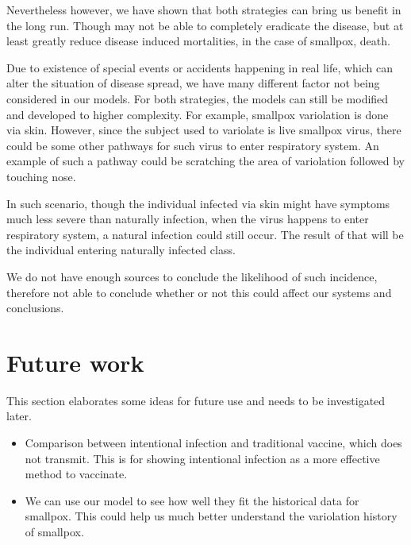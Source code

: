 \documentclass[12pt]{article}
\begin{document}
Nevertheless however, we have shown that both strategies can bring us benefit in the long run. Though may not be able to completely eradicate the disease, but at least greatly reduce disease induced mortalities, in the case of smallpox, death.

Due to existence of special events or accidents happening in real life, which can alter the situation of disease spread, we have many different factor not being considered in our models. For both strategies, the models can still be modified and developed to higher complexity. For example, smallpox variolation is done via skin. However, since the subject used to variolate is live smallpox virus, there could be some other pathways for such virus to enter respiratory system. An example of such a pathway could be scratching the area of variolation followed by touching nose.

In such scenario, though the individual infected via skin might have symptoms much less severe than naturally infection, when the virus happens to enter respiratory system, a natural infection could still occur. The result of that will be the individual entering naturally infected class.

We do not have enough sources to conclude the likelihood of such incidence, therefore not able to conclude whether or not this could affect our systems and conclusions.
\section{Future work}
This section elaborates some ideas for future use and needs to be investigated later.
\begin{itemize}
\item Comparison between intentional infection and traditional vaccine, which does not transmit. This is for showing intentional infection as a more effective method to vaccinate.
\item We can use our model to see how well they fit the historical data for smallpox. This could help us much better understand the variolation history of smallpox.
\end{itemize}
\end{document}
